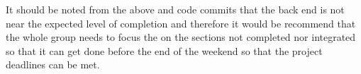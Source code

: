 It should be noted from the above and code commits that the back end is not near the expected level of completion and therefore it would be recommend that the whole group needs to focus the on the sections not completed nor integrated so that it can get done before the end of the weekend so that the project deadlines can be met.